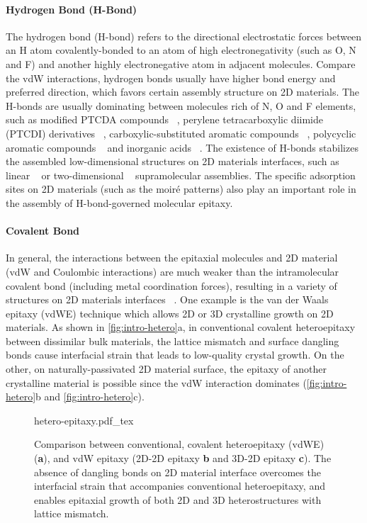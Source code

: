 \paragraph{Hydrogen Bond (H-Bond)}

The hydrogen bond (H-bond) refers to the directional electrostatic
forces between an H atom covalently-bonded to an atom of high
electro\-negativity (such as O, N and F) and another highly
electro\-negative atom in adjacent molecules. Compare the vdW
interactions, hydrogen bonds usually have higher bond energy and
preferred direction, which favors certain assembly structure on 2D
materials. The H-bonds are usually dominating between molecules rich
of N, O and F elements, such as modified PTCDA compounds
~\cite{Mura_2010_DFT_H_bond_PTCDA_gr,Karmel_2014_assembl_hetero_gr},
perylene tetra\-carboxylic diimide (PTCDI) derivatives
~\cite{Pollard_2010_hbond_assembly_gr,Karmel_2014_PTCDI_gr},
carboxylic-substituted aromatic compounds
~\cite{Rochefort_2009_aro_graphene_mech,Addou_2013_TPA_gr}, polycyclic
aromatic compounds
~\cite{Kozlov_2012_polyaro_gr,Roos_2011_BTP_gr,Meier_2010_polycyclic_gr}
and inorganic acids ~\cite{Prado_2011_2D_acid_gr}. The existence of
H-bonds stabilizes the assembled low-dimensional structures on 2D
materials interfaces, such as linear
~\cite{Pollard_2010_hbond_assembly_gr} or two-dimensional
~\cite{Prado_2011_2D_acid_gr} supra\-molecular assemblies. The specific
adsorption sites on 2D materials (such as the moiré patterns) also
play an important role in the assembly of H-bond-governed molecular
epitaxy.


\paragraph{Covalent Bond}
In general, the interactions between the epitaxial molecules and 2D
material (vdW and Coulombic interactions) are much weaker than the
intra\-molecular covalent bond (including metal coordination forces),
resulting in a variety of structures on 2D materials interfaces
~\cite{Bakti_Utama_2013_rev_epitax}. One example is the van der Waals
epitaxy (vdWE) technique which allows 2D or 3D crystalline growth on
2D materials. As shown in \autoref{fig:intro-hetero}a, in conventional
covalent heteroepitaxy between dissimilar bulk materials, the lattice
mismatch and surface dangling bonds cause interfacial strain that
leads to low-quality crystal growth. On the other, on
naturally-passivated 2D material surface, the epitaxy of another
crystalline material is possible since the vdW interaction dominates
(\autoref{fig:intro-hetero}b and \autoref{fig:intro-hetero}c).
\begin{figure}[h]
  \centering
  {hetero-epitaxy.pdf_tex}
  \caption{\label{fig:intro-hetero} %
    Comparison between conventional, covalent hetero\-epitaxy (vdWE)
    (\textbf{a}), and vdW epitaxy (2D-2D epitaxy \textbf{b} and 3D-2D
    epitaxy \textbf{c}). The absence of dangling bonds on 2D material
    interface overcomes the interfacial strain that accompanies
    conventional hetero\-epitaxy, and enables epitaxial growth of both
    2D and 3D heterostructures with lattice mismatch.%
  }
\end{figure}

